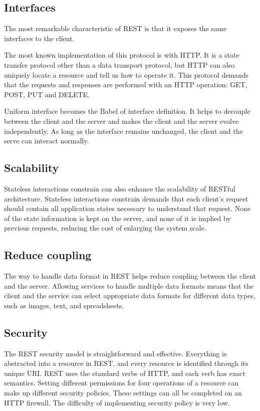 \documentclass[conference]{IEEEtran}
\begin{document}
\subsection{Interfaces}

The most remarkable characteristic of REST is that it exposes the same interfaces to the client. 

The most known implementation of this protocol is with HTTP. It is a state transfer protocol other than a data transport protocol, but HTTP can also uniquely locate a resource and tell us how to operate it. This protocol demands that the requests and responses are performed with an HTTP operation: GET, POST, PUT and DELETE. 

Uniform interface becomes the Babel of interface definition. It helps to decouple between the client and the server and makes the client and the server evolve independently. As long as the interface remains unchanged, the client and the serve can interact normally.

\subsection{Scalability}

Stateless interactions constrain can also enhance the scalability of RESTful architecture. Stateless interactions constrain demands that each client's request should contain all application states necessary to understand that request. None of the state information is kept on the server, and none of it is implied by previous requests, reducing the cost of enlarging the system scale. 

\subsection{Reduce coupling}

The way to handle data format in REST helps reduce coupling between the client and the server. Allowing services to handle multiple data formats means that the client and the service can select appropriate data formats for different data types, such as images, text, and spreadsheets.

\subsection{Security}

The REST security model is straightforward and effective. Everything is abstracted into a resource in REST, and every resource is identified through its unique URI. REST uses the standard verbs of HTTP, and each verb has exact semantics. Setting different permissions for four operations of a resource can make up different security policies. These settings can all be completed on an HTTP firewall. The difficulty of implementing security policy is very low.
\end{document}
